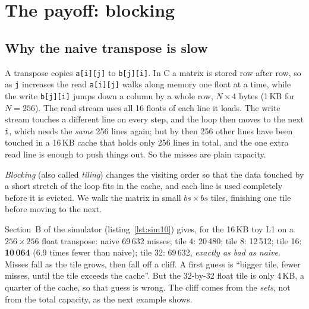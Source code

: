 \section{The payoff: blocking}
\label{sec:blocking10}

\subsection*{Why the naive transpose is slow}

A transpose copies \texttt{a[i][j]} to \texttt{b[j][i]}. In C a matrix
is stored row after row, so as \texttt{j} increases the read
\texttt{a[i][j]} walks along memory one float at a time, while the write
\texttt{b[j][i]} jumps down a column by a whole row, \(N\times4\) bytes
(1\,KB for \(N{=}256\)). The read stream uses all 16 floats of each line it
loads. The write stream touches a different line on every step, and
the loop then moves to the next \texttt{i}, which needs the \emph{same}
256 lines again; but by then 256 other lines have been touched in a
16\,KB cache that holds only 256 lines in total, and the one extra read
line is enough to push things out. So the misses are plain capacity.

\emph{Blocking} (also called \emph{tiling}) changes the visiting order
so that the data touched by a short stretch of the loop fits in the
cache, and each line is used completely before it is evicted. We walk the
matrix in small \(bs\times bs\) tiles, finishing one tile before moving
to the next.



\begin{example}
Section~B of the simulator (listing~\ref{lst:sim10}) gives, for the 16\,KB
toy L1 on a $256\times256$ float transpose: naive 69\,632 misses; tile
4: 20\,480; tile 8: 12\,512; tile 16: \textbf{10\,064} (6.9 times fewer than
naive); tile 32: 69\,632, \emph{exactly as bad as naive}. Misses fall as
the tile grows, then fall off a cliff. A first guess is ``bigger tile,
fewer misses, until the tile exceeds the cache''. But the 32-by-32 float
tile is only 4\,KB, a quarter of the cache, so that guess is wrong. The
cliff comes from the \emph{sets}, not from the total capacity, as the
next example shows.
\end{example}

